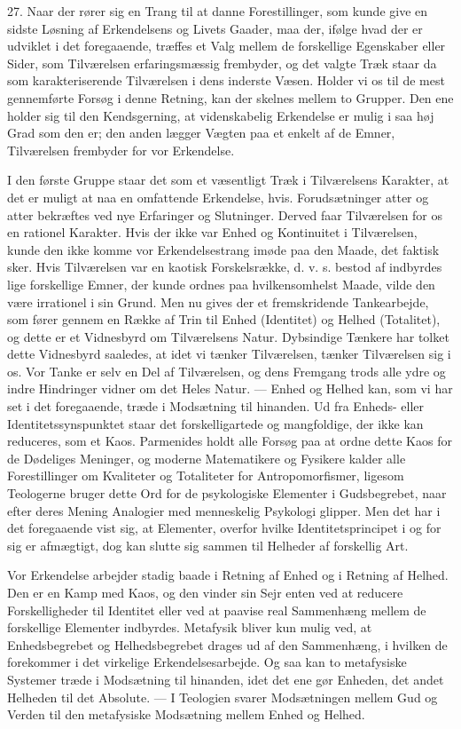 \documentclass[12pt]{article}
\newcommand{\apage}[1]{\marginnote{\footnotesize\textit{[#1]}}}
\begin{document}
27. Naar der rører sig en Trang til at danne Forestillinger, som kunde give en
sidste Løsning af Erkendelsens og Livets Gaader, maa der, ifølge hvad der er
udviklet i det foregaaende, træffes et Valg mellem de forskellige Egenskaber
eller Sider, som Tilværelsen erfaringsmæssig frembyder, og det valgte Træk
staar da som karakteriserende Tilværelsen i dens inderste Væsen. Holder vi os
til de mest gennemførte Forsøg i denne Retning, kan der skelnes mellem to
Grupper. Den ene holder sig til den Kendsgerning, at videnskabelig Erkendelse
er mulig i saa høj Grad som den er; den anden lægger Vægten paa et enkelt af de
Emner, Tilværelsen frembyder for vor Erkendelse.

I den første Gruppe staar det som et væsentligt Træk i Tilværelsens Karakter,
at det er muligt at naa en omfattende Erkendelse, hvis. Forudsætninger atter og
atter bekræftes ved nye Erfaringer og Slutninger. Derved faar Tilværelsen for
os en rationel Karakter. Hvis der ikke var Enhed og Kontinuitet i Tilværelsen,
kunde den ikke komme vor Erkendelsestrang imøde paa den Maade, det faktisk
sker. Hvis Tilværelsen var en kaotisk Forskelsrække, d. v. s. bestod af
indbyrdes lige forskellige Emner, der kunde ordnes paa hvilkensomhelst Maade,
vilde den være irrationel i sin Grund. Men nu gives der et fremskridende
Tankearbejde, som fører gennem en Række af Trin til Enhed (Identitet) og Helhed
(Totalitet), og dette er et Vidnesbyrd om Tilværelsens Natur. Dybsindige
Tænkere har tolket
\setcounter{footnote}{0}%
\apage{89}dette Vidnesbyrd saaledes, at idet vi tænker Tilværelsen, tænker
Tilværelsen sig i os. Vor Tanke er selv en Del af Tilværelsen, og dens Fremgang
trods alle ydre og indre Hindringer vidner om det Heles Natur. --- Enhed og
Helhed kan, som vi har set i det foregaaende, træde i Modsætning til hinanden.
Ud fra Enheds- eller Identitetssynspunktet staar det forskelligartede og
mangfoldige, der ikke kan reduceres, som et Kaos. Parmenides holdt alle Forsøg
paa at ordne dette Kaos for \guillemotright{}de Dødeliges
Meninger\guillemotleft{}, og moderne Matematikere og Fysikere kalder alle
Forestillinger om Kvaliteter og Totaliteter for
\guillemotright{}Antropomorfismer\guillemotleft{}, ligesom Teologerne bruger
dette Ord for de psykologiske Elementer i Gudsbegrebet, naar efter deres Mening
Analogier med menneskelig Psykologi glipper. Men det har i det foregaaende vist
sig, at Elementer, overfor hvilke Identitetsprincipet i og for sig er
afmægtigt, dog kan slutte sig sammen til Helheder af forskellig Art.

Vor Erkendelse arbejder stadig baade i Retning af Enhed og i Retning af Helhed.
Den er en Kamp med Kaos, og den vinder sin Sejr enten ved at reducere
Forskelligheder til Identitet eller ved at paavise real Sammenhæng mellem de
forskellige Elementer indbyrdes. Metafysik bliver kun mulig ved, at
Enhedsbegrebet og Helhedsbegrebet drages ud af den Sammenhæng, i hvilken de
forekommer i det virkelige Erkendelsesarbejde. Og saa kan to metafysiske
Systemer træde i Modsætning til hinanden, idet det ene gør Enheden, det andet
Helheden til det Absolute. --- I Teologien svarer Modsætningen mellem Gud og
Verden til den metafysiske Modsætning mellem Enhed og Helhed.
\end{document}

